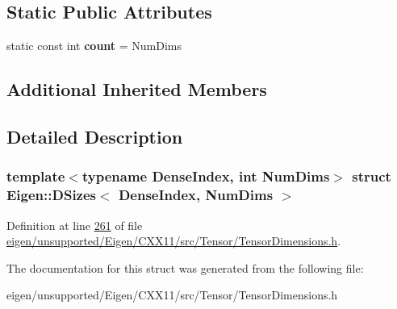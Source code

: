 \subsection*{Static Public Attributes}
\begin{DoxyCompactItemize}
\item 
\mbox{\label{struct_eigen_1_1_d_sizes_a08c1891284fcf0e75de20284db308c92}} 
static const int {\bfseries count} = Num\+Dims
\end{DoxyCompactItemize}
\subsection*{Additional Inherited Members}


\subsection{Detailed Description}
\subsubsection*{template$<$typename Dense\+Index, int Num\+Dims$>$\newline
struct Eigen\+::\+D\+Sizes$<$ Dense\+Index, Num\+Dims $>$}



Definition at line \hyperlink{eigen_2unsupported_2_eigen_2_c_x_x11_2src_2_tensor_2_tensor_dimensions_8h_source_l00261}{261} of file \hyperlink{eigen_2unsupported_2_eigen_2_c_x_x11_2src_2_tensor_2_tensor_dimensions_8h_source}{eigen/unsupported/\+Eigen/\+C\+X\+X11/src/\+Tensor/\+Tensor\+Dimensions.\+h}.



The documentation for this struct was generated from the following file\+:\begin{DoxyCompactItemize}
\item 
eigen/unsupported/\+Eigen/\+C\+X\+X11/src/\+Tensor/\+Tensor\+Dimensions.\+h\end{DoxyCompactItemize}
